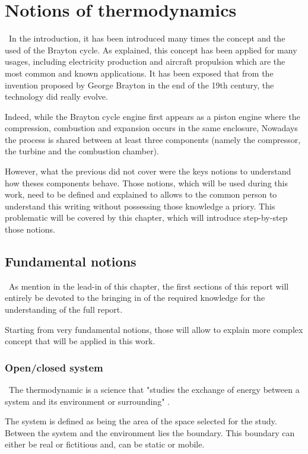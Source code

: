 \graphicspath{{Chapter_2_-_Notions_of_thermodynamics/Images/}}
\chapter{Notions of thermodynamics}
\quad\, In the introduction, it has been introduced many times the concept and the used of the Brayton cycle. As explained, this concept has been applied for many usages, including electricity production and aircraft propulsion which are the most common and known applications. It has been exposed that from the invention proposed by George Brayton in the end of the 19th century, the technology did really evolve.

Indeed, while the Brayton cycle engine first appears as a  piston engine where the compression, combustion and expansion occurs in the same enclosure, Nowadays 
the process is shared between at least three components (namely the compressor, the turbine and the combustion chamber).

However, what the previous did not cover were the keys notions to understand how theses components behave. Those notions, which will be used during this work, need to be defined and explained to allows to the common person to understand this writing without possessing those knowledge a priory. 
This problematic will be covered by this chapter, which will introduce step-by-step those notions.

\section{Fundamental notions}
\quad\, As mention in the lead-in of this chapter, the first sections of this report will entirely be devoted to the bringing in of the required knowledge for the understanding of the full report.

Starting from very fundamental notions, those will allow to explain more complex concept that will be applied in this work.
\newpage
\subsection{Open/closed system}\label{sect:C2_Sys}
\quad\,  The thermodynamic is a science that "studies the exchange of energy between a system and its environment or surrounding" \cite{thermoApp_1}.

The system is defined as being the area of the space selected for the study. Between the system and the environment lies the boundary. This boundary can either be real or fictitious and, can be static or mobile.


